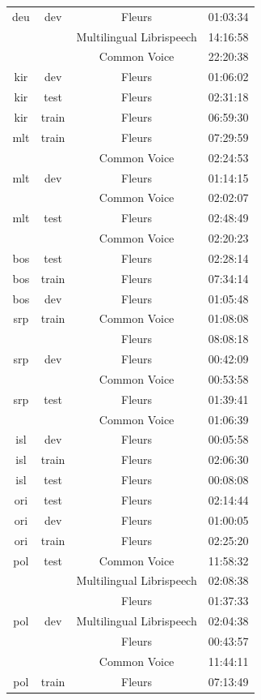 \begin{longtable}{cccc}
deu & dev & Fleurs & 01:03:34 \\ 
 & & Multilingual Librispeech & 14:16:58 \\ 
 & & Common Voice & 22:20:38 \\ \midrule
kir & dev & Fleurs & 01:06:02 \\ 
kir & test & Fleurs & 02:31:18 \\ 
kir & train & Fleurs & 06:59:30 \\ \midrule
mlt & train & Fleurs & 07:29:59 \\ 
 & & Common Voice & 02:24:53 \\ 
mlt & dev & Fleurs & 01:14:15 \\ 
 & & Common Voice & 02:02:07 \\ 
mlt & test & Fleurs & 02:48:49 \\ 
 & & Common Voice & 02:20:23 \\ \midrule
bos & test & Fleurs & 02:28:14 \\ 
bos & train & Fleurs & 07:34:14 \\ 
bos & dev & Fleurs & 01:05:48 \\ \midrule
srp & train & Common Voice & 01:08:08 \\ 
 & & Fleurs & 08:08:18 \\ 
srp & dev & Fleurs & 00:42:09 \\ 
 & & Common Voice & 00:53:58 \\ 
srp & test & Fleurs & 01:39:41 \\ 
 & & Common Voice & 01:06:39 \\ \midrule
isl & dev & Fleurs & 00:05:58 \\ 
isl & train & Fleurs & 02:06:30 \\ 
isl & test & Fleurs & 00:08:08 \\ \midrule
ori & test & Fleurs & 02:14:44 \\ 
ori & dev & Fleurs & 01:00:05 \\ 
ori & train & Fleurs & 02:25:20 \\ \midrule
pol & test & Common Voice & 11:58:32 \\ 
 & & Multilingual Librispeech & 02:08:38 \\ 
 & & Fleurs & 01:37:33 \\ 
pol & dev & Multilingual Librispeech & 02:04:38 \\ 
 & & Fleurs & 00:43:57 \\ 
 & & Common Voice & 11:44:11 \\ 
pol & train & Fleurs & 07:13:49 \\ 

\end{longtable}
